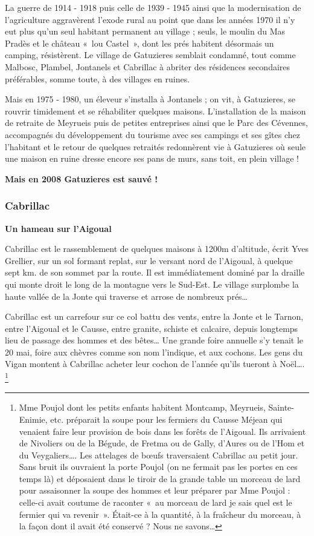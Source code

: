 La guerre de 1914 - 1918 puis celle de 1939 - 1945 ainsi que la modernisation de l’agriculture
aggravèrent l’exode rural au point que dans les années 1970 il n’y eut plus qu’un seul habitant
permanent au village ; seuls, le moulin du Mas Pradès et le château «~lou Castel~», dont les
prés habitent désormais un camping, résistèrent.
Le village de Gatuzieres semblait condamné, tout comme Malbosc, Plambel, Jontanels et Cabrillac à
abriter des résidences secondaires préférables, somme toute, à des villages en ruines.

Mais en 1975 - 1980, un éleveur s’installa à Jontanels ; on vit, à Gatuzieres, se rouvrir
timidement et se réhabiliter quelques maisons. L’installation de la maison de retraite de
Meyrueis puis de petites entreprises ainsi que le Parc des Cévennes, accompagnés du
développement du tourisme avec ses campings et ses gîtes chez l’habitant et le retour de
quelques retraités redonnèrent vie à Gatuzieres où seule une maison en ruine dresse encore ses
pans de murs, sans toit, en plein village !

\begin{center}
    \textbf{Mais en 2008 Gatuzieres est sauvé !}
\end{center}

\subsubsection{Cabrillac}

\textbf {Un hameau sur l’Aigoual}

Cabrillac est le rassemblement de quelques maisons à 1200m d’altitude, écrit Yves Grellier,
sur un sol formant replat, sur le versant nord de l’Aigoual, à quelque sept km. de son sommet
par la route. Il est immédiatement dominé par la draille qui monte droit le long de la
montagne vers le Sud-Est. Le village surplombe la haute vallée de la Jonte qui traverse et
arrose de nombreux prés…

Cabrillac est un carrefour sur ce col battu des vents, entre la Jonte et le Tarnon, entre
l’Aigoual et le Causse, entre granite, schiste et calcaire, depuis longtemps lieu de passage des
hommes et des bêtes… Une grande foire annuelle s’y tenait le 20 mai, foire aux chèvres
comme son nom l’indique, et aux cochons. Les gens du Vigan montent à Cabrillac acheter
leur cochon de l’année qu’ils tueront à Noël…. \footnote{Mme Poujol dont les petits enfants habitent Montcamp, Meyrueis, Sainte-Enimie, etc. préparait la soupe pour les fermiers du Causse Méjean qui venaient faire leur provision de bois dans les forêts de l’Aigoual. Ils arrivaient de Nivoliers ou de la Bégude, de Fretma ou de Gally, d’Aures ou de l’Hom et du Veygaliers…. Les attelages de bœufs traversaient Cabrillac au petit jour. Sans bruit ils ouvraient la porte Poujol (on ne fermait pas les portes en ces temps là) et déposaient dans le tiroir de la grande table un morceau de lard pour assaisonner la soupe des hommes et leur préparer par Mme Poujol : celle-ci avait coutume de raconter «~au morceau de lard je sais quel est le fermier qui va revenir~». Était-ce à la quantité, à la fraîcheur du morceau, à la façon dont il avait été conservé ? Nous ne savons…}

